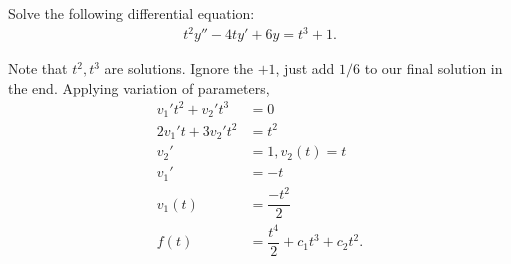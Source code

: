 \documentclass[11pt]{article}
\begin{document}
        \begin{problem}[Problem 5]
            Solve the following differential equation:
            \begin{align}
                t^2y'' - 4ty' + 6y = t^3 + 1. 
            \end{align}
        \end{problem}
        \begin{solution}
            Note that $t^2,t^3$ are solutions. Ignore the $+1$, just add $1/6$ to our final solution in the end. Applying variation of parameters,
            \begin{align}
                v_1't^2 + v_2't^3 &= 0 \\
                2v_1't + 3v_2't^2 &= t^2 \\
                v_2' &= 1, v_2(t) = t \\
                v_1' &= -t \\
                v_1(t) &= \dfrac{-t^2}{2} \\
                f(t) &= \dfrac{t^4}{2} + c_1t^3 + c_2t^2.
            \end{align}
        \end{solution}
\end{document}
